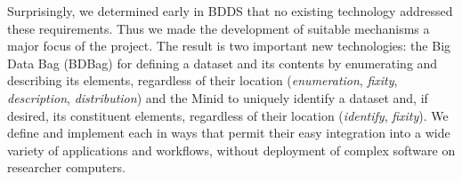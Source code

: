 \documentclass[11pt]{article}
\begin{document}

Surprisingly, we determined early in BDDS that no existing technology addressed these requirements.
Thus we made the development of suitable mechanisms a major focus of the project.
The result is two important new technologies:
the Big Data Bag (BDBag) for defining a dataset and its contents by enumerating and describing its elements, 
regardless of their location (\emph{enumeration}, \emph{fixity}, \emph{description}, \emph{distribution})
and the Minid to uniquely identify a dataset and, if desired, its constituent elements, 
regardless of their location (\emph{identify}, \emph{fixity}).
We define and implement each in ways that permit their easy integration into a wide variety of
applications and workflows, without deployment of complex software on researcher computers.
\end{document}
